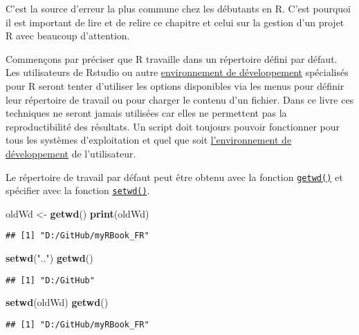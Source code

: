 \documentclass[]{book}
\newenvironment{Shaded}{\begin{snugshade}}{\end{snugshade}}
\newcommand{\KeywordTok}[1]{\textcolor[rgb]{0.13,0.29,0.53}{\textbf{#1}}}
\newcommand{\StringTok}[1]{\textcolor[rgb]{0.31,0.60,0.02}{#1}}
\newcommand{\NormalTok}[1]{#1}
\theoremstyle{definition}
\theoremstyle{definition}
\theoremstyle{definition}
\theoremstyle{remark}
\begin{document}
C'est la source d'erreur la plus commune chez les débutants en R. C'est
pourquoi il est important de lire et de relire ce chapitre et celui sur
la gestion d'un projet R avec beaucoup d'attention.

Commençons par préciser que R travaille dans un répertoire défini par
défaut. Les utilisateurs de Rstudio ou autre
\protect\hyperlink{IDE}{environnement de développement} spécialisés pour
R seront tenter d'utiliser les options disponibles via les menus pour
définir leur répertoire de travail ou pour charger le contenu d'un
fichier. Dans ce livre ces techniques ne seront jamais utilisées car
elles ne permettent pas la reproductibilité des résultats. Un script
doit toujours pouvoir fonctionner pour tous les systèmes d'exploitation
et quel que soit \protect\hyperlink{IDE}{l'environnement de
développement} de l'utilisateur.

Le répertoire de travail par défaut peut être obtenu avec la fonction
\protect\hyperlink{l015getwd}{\texttt{getwd()}} et spécifier avec la
fonction \protect\hyperlink{l015setwd}{\texttt{setwd()}}.

\begin{Shaded}
\begin{Highlighting}[]
\NormalTok{oldWd <-}\StringTok{ }\KeywordTok{getwd}\NormalTok{()}
\KeywordTok{print}\NormalTok{(oldWd)}
\end{Highlighting}
\end{Shaded}

\begin{verbatim}
## [1] "D:/GitHub/myRBook_FR"
\end{verbatim}

\begin{Shaded}
\begin{Highlighting}[]
\KeywordTok{setwd}\NormalTok{(}\StringTok{".."}\NormalTok{)}
\KeywordTok{getwd}\NormalTok{()}
\end{Highlighting}
\end{Shaded}

\begin{verbatim}
## [1] "D:/GitHub"
\end{verbatim}

\begin{Shaded}
\begin{Highlighting}[]
\KeywordTok{setwd}\NormalTok{(oldWd)}
\KeywordTok{getwd}\NormalTok{()}
\end{Highlighting}
\end{Shaded}

\begin{verbatim}
## [1] "D:/GitHub/myRBook_FR"
\end{verbatim}
\end{document}
